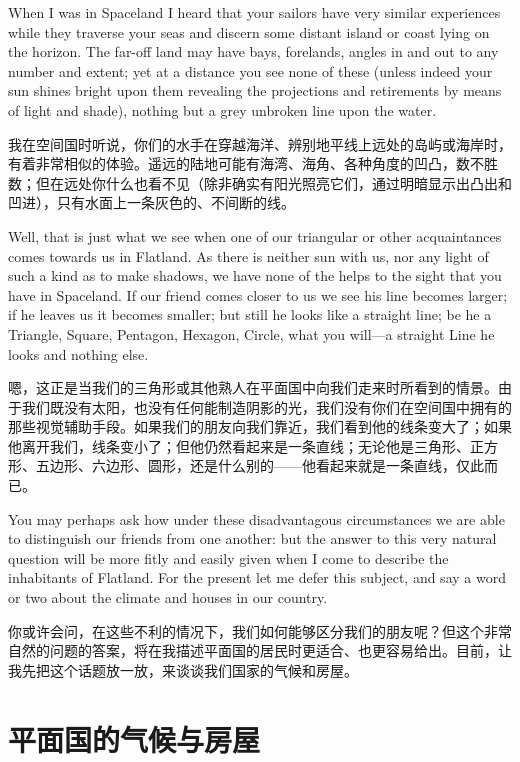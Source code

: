 \documentclass[12pt,UTF8]{ctexbook}
\begin{document}
When I was in Spaceland I heard that your sailors have very similar experiences while they traverse your seas and discern some distant island or coast lying on the horizon. The far-off land may have bays, forelands, angles in and out to any number and extent; yet at a distance you see none of these (unless indeed your sun shines bright upon them revealing the projections and retirements by means of light and shade), nothing but a grey unbroken line upon the water.

我在空间国时听说，你们的水手在穿越海洋、辨别地平线上远处的岛屿或海岸时，有着非常相似的体验。遥远的陆地可能有海湾、海角、各种角度的凹凸，数不胜数；但在远处你什么也看不见（除非确实有阳光照亮它们，通过明暗显示出凸出和凹进），只有水面上一条灰色的、不间断的线。

Well, that is just what we see when one of our triangular or other acquaintances comes towards us in Flatland. As there is neither sun with us, nor any light of such a kind as to make shadows, we have none of the helps to the sight that you have in Spaceland. If our friend comes closer to us we see his line becomes larger; if he leaves us it becomes smaller; but still he looks like a straight line; be he a Triangle, Square, Pentagon, Hexagon, Circle, what you will---a straight Line he looks and nothing else.

嗯，这正是当我们的三角形或其他熟人在平面国中向我们走来时所看到的情景。由于我们既没有太阳，也没有任何能制造阴影的光，我们没有你们在空间国中拥有的那些视觉辅助手段。如果我们的朋友向我们靠近，我们看到他的线条变大了；如果他离开我们，线条变小了；但他仍然看起来是一条直线；无论他是三角形、正方形、五边形、六边形、圆形，还是什么别的——他看起来就是一条直线，仅此而已。

You may perhaps ask how under these disadvantagous circumstances we are able to distinguish our friends from one another: but the answer to this very natural question will be more fitly and easily given when I come to describe the inhabitants of Flatland. For the present let me defer this subject, and say a word or two about the climate and houses in our country.

你或许会问，在这些不利的情况下，我们如何能够区分我们的朋友呢？但这个非常自然的问题的答案，将在我描述平面国的居民时更适合、也更容易给出。目前，让我先把这个话题放一放，来谈谈我们国家的气候和房屋。

\chapter{平面国的气候与房屋}
\end{document}
